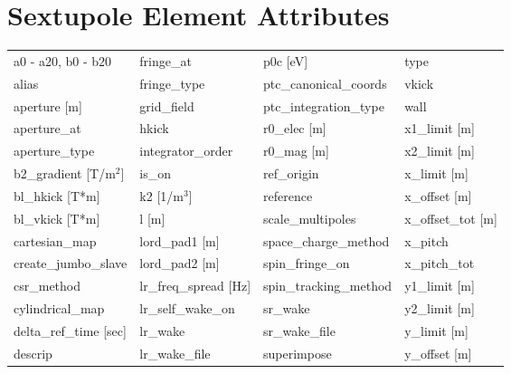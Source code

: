 \section{Sextupole Element Attributes}
 \label{s:list.sextupole}
 
 \begin{tabular}{llll} \toprule
a0 - a20, b0 - b20             & fringe_at                      & p0c [eV]                       & type                           \\
alias                          & fringe_type                    & ptc_canonical_coords           & vkick                          \\
aperture [m]                   & grid_field                     & ptc_integration_type           & wall                           \\
aperture_at                    & hkick                          & r0_elec [m]                    & x1_limit [m]                   \\
aperture_type                  & integrator_order               & r0_mag [m]                     & x2_limit [m]                   \\
b2_gradient [T/m$^2$]          & is_on                          & ref_origin                     & x_limit [m]                    \\
bl_hkick [T*m]                 & k2 [1/m$^3$]                   & reference                      & x_offset [m]                   \\
bl_vkick [T*m]                 & l [m]                          & scale_multipoles               & x_offset_tot [m]               \\
cartesian_map                  & lord_pad1 [m]                  & space_charge_method            & x_pitch                        \\
create_jumbo_slave             & lord_pad2 [m]                  & spin_fringe_on                 & x_pitch_tot                    \\
csr_method                     & lr_freq_spread [Hz]            & spin_tracking_method           & y1_limit [m]                   \\
cylindrical_map                & lr_self_wake_on                & sr_wake                        & y2_limit [m]                   \\
delta_ref_time [sec]           & lr_wake                        & sr_wake_file                   & y_limit [m]                    \\
descrip                        & lr_wake_file                   & superimpose                    & y_offset [m]                   \\

\end{tabular}
